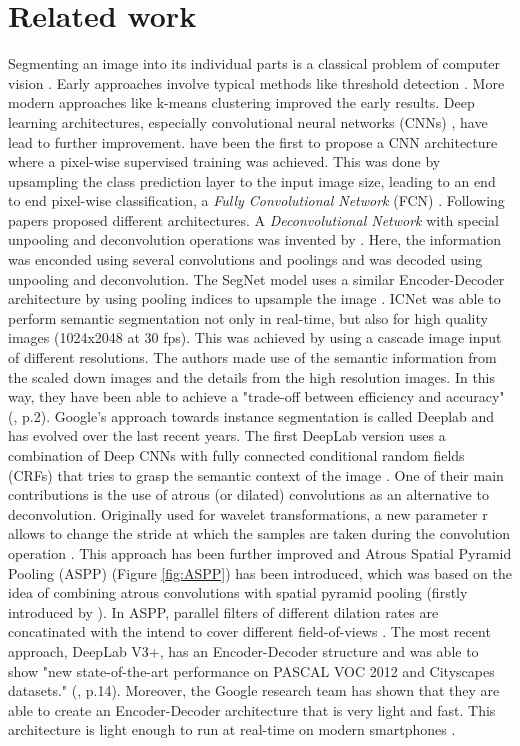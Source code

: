 \documentclass[11pt,
  paper=a4, 
  bibliography=totocnumbered,
	captions=tableheading,
	BCOR=10mm
]{scrreprt}
\theoremstyle{definition}
\newcommand{\figref}[1]{(Figure \ref{#1})}
\begin{document}
\section{Related work}
\label{sec:related_work}

Segmenting an image into its individual parts is a classical problem of computer vision \cite{Szeliski2011}. 
Early approaches involve typical methods like threshold detection \cite{Smith1979}.
More modern approaches like k-means clustering \cite{Dhanachandra2015} improved the early results.
Deep learning architectures, especially convolutional neural networks (CNNs) \cite{Fukushima1980}, have lead to further improvement.
\textcite{Shelhamer2017} have been the first to propose a CNN architecture where a pixel-wise supervised training was achieved. 
This was done by upsampling the class prediction layer to the input image size, leading to an end to end pixel-wise classification, a \textit{Fully Convolutional Network} (FCN) \cite{Shelhamer2017}.
Following papers proposed different architectures.
A \textit{Deconvolutional Network} with special unpooling and deconvolution operations was invented by \textcite{Noh2015}. 
Here, the information was enconded using several convolutions and poolings and was decoded using unpooling and deconvolution.
The SegNet model uses a similar Encoder-Decoder architecture by using pooling indices to upsample the image \cite{Badrinarayanan2017}.
ICNet \cite{Zhao2017} was able to perform semantic segmentation not only in real-time, but also for high quality images (1024x2048 at 30 fps). 
This was achieved by using a cascade image input of different resolutions. 
The authors made use of the semantic information from the scaled down images and the details from the high resolution images.
In this way, they have been able to achieve a "trade-off between efficiency and accuracy" (\cite{Zhao2017}, p.2).
Google's approach towards instance segmentation is called Deeplab and has evolved over the last recent years.
The first DeepLab version uses a combination of Deep CNNs with fully connected conditional random fields (CRFs) that tries to grasp the semantic context of the image \cite{Chen2018}. 
One of their main contributions is the use of atrous (or dilated) convolutions as an alternative to deconvolution. 
Originally used for wavelet transformations, a new parameter r allows to change the stride at which the samples are taken during the convolution operation \cite{Chen2018}.
This approach has been further improved and Atrous Spatial Pyramid Pooling (ASPP) \figref{fig:ASPP} has been introduced, which was based on the idea of combining atrous convolutions with spatial pyramid pooling \cite{Chen2018a} (firstly introduced by \textcite{He2014}).
In ASPP, parallel filters of different dilation rates are concatinated with the intend to cover different field-of-views \cite{Chen2018a}.
The most recent approach, DeepLab V3+, has an Encoder-Decoder structure and was able to show "new state-of-the-art performance on PASCAL VOC 2012 and Cityscapes datasets." (\cite{Chen2018b}, p.14).
Moreover, the Google research team has shown that they are able to create an Encoder-Decoder architecture that is very light and fast.
This architecture is light enough to run at real-time on modern smartphones \cite{Bazarevsky2018}.
\end{document}
